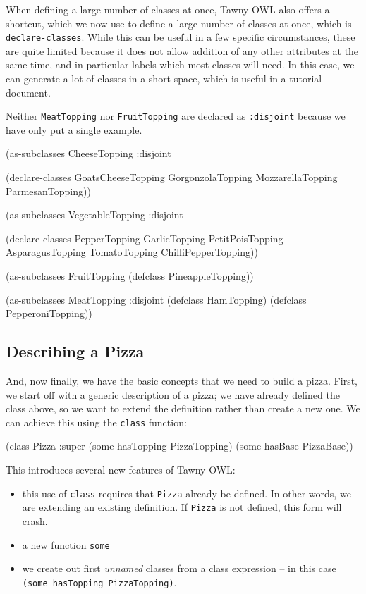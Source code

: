 When defining a large number of classes at once, Tawny-OWL also offers a
shortcut, which we now use to define a large number of classes at once, which
is \verb~declare-classes~. While this can be useful in a few specific
circumstances, these are quite limited because it does not allow addition of
any other attributes at the same time, and in particular labels which most
classes will need. In this case, we can generate a lot of classes in a short
space, which is useful in a tutorial document.

Neither \verb~MeatTopping~ nor \verb~FruitTopping~ are declared as \verb~:disjoint~ because
we have only put a single example.

\begin{tawny}
(as-subclasses
 CheeseTopping
 :disjoint

 (declare-classes
  GoatsCheeseTopping
  GorgonzolaTopping
  MozzarellaTopping
  ParmesanTopping))

(as-subclasses
 VegetableTopping
 :disjoint

 (declare-classes
  PepperTopping
  GarlicTopping
  PetitPoisTopping
  AsparagusTopping
  TomatoTopping
  ChilliPepperTopping))

(as-subclasses
 FruitTopping
 (defclass PineappleTopping))

(as-subclasses
 MeatTopping
 :disjoint
 (defclass HamTopping)
 (defclass PepperoniTopping))
\end{tawny}

\subsection{Describing a Pizza}
\label{sec-5-5}

And, now finally, we have the basic concepts that we need to build a pizza.
First, we start off with a generic description of a pizza; we have already
defined the class above, so we want to extend the definition rather than
create a new one. We can achieve this using the \verb~class~ function:

\begin{tawny}
(class Pizza
   :super
   (some hasTopping PizzaTopping)
   (some hasBase PizzaBase))
\end{tawny}

This introduces several new features of Tawny-OWL:
\begin{itemize}
\item this use of \verb~class~ requires that \verb~Pizza~ already be defined. In other
words, we are extending an existing definition. If \verb~Pizza~ is not defined,
this form will crash.
\item a new function \verb~some~
\item we create out first \emph{unnamed} classes from a class expression -- in this
case \verb~(some hasTopping PizzaTopping)~.
\end{itemize}

